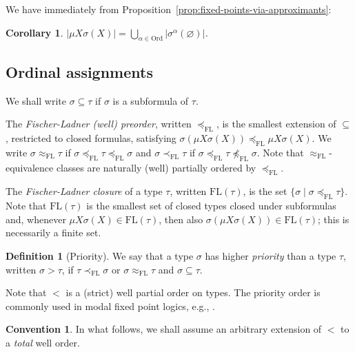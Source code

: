 \documentclass[10pt,a4paper]{amsart}
\theoremstyle{plain}
\newtheorem{corollary}[corollary]{Corollary}
\theoremstyle{definition}
\newtheorem{definition}[definition]{Definition}
\newtheorem{remark}[remark]{Remark}
\newtheorem{convention}[convention]{Convention}
\renewcommand{\emptyset}{\varnothing}
\theoremstyle{plain}
\theoremstyle{definition} %
\newcommand{\Ord}{\mathrm{Ord}}
\newcommand{\subform}{\subseteq}
\newcommand{\FL}{\mathrm{FL}}
\newcommand{\fl}[1]{\FL(#1)}
\newcommand{\flleq}{\preceq_\FL}
\newcommand{\fleq}{\approx_\FL}
\newcommand{\flnleq}{\prec_\FL}
\newcommand{\hr}[1]{|#1|}
\begin{document}
We have immediately from Proposition~\ref{prop:fixed-points-via-approximants}:
\begin{corollary}
\label{cor:hr-mu-as-limit-of-approximants}
$\hr{\mu X \sigma(X)} = \bigcup\limits_{\alpha \in \Ord} \hr{\sigma^\alpha(\emptyset)}$.
\end{corollary}



\subsection{Ordinal assignments}


We shall write $\sigma \subform \tau$ if $\sigma$ is a subformula of $\tau$.


The \emph{Fischer-Ladner (well) preorder}, written $\flleq$,
is the smallest extension of $\subform$, restricted to closed formulas, satisfying
$\sigma(\mu X \sigma(X)) \flleq \mu X \sigma(X)$.
We write $\sigma \fleq \tau$ if $\sigma \flleq \tau \flleq \sigma$ and $\sigma \flnleq \tau$ if $\sigma \flleq \tau \not\flleq \sigma$.
Note that $\fleq$-equivalence classes are naturally (well) partially ordered by $\flleq$.

The \emph{Fischer-Ladner closure} of a type $\tau$, written $\fl \tau$, is the set $\{\sigma \mid \sigma \flleq \tau\}$.
Note that $\fl \tau$ is the smallest set of closed types closed under subformulas and, whenever $\mu X\sigma(X) \in \fl \tau$, then also $\sigma(\mu X\sigma(X)) \in \fl \tau$; this is necessarily a finite set.

\begin{definition}
[Priority]
We say that a type $\sigma$ has higher \emph{priority} than a type $\tau$, written $\sigma>\tau$, if $\tau \flnleq \sigma$ or $\sigma \fleq \tau $ and $\sigma \subform \tau$.

\end{definition}
Note that $<$ is a (strict) well partial order on types. 
The priority order is commonly used in modal fixed point logics, e.g., \cite{Studer08:mu-calc,Doumane17thesis,venema2008lectures}.

\begin{convention}
In what follows, we shall assume an arbitrary extension of $<$ to a \emph{total} well order.    
\end{convention}
\end{document}
